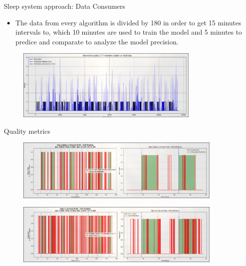 \documentclass[10pt]{beamer} %
\begin{document}
\begin{frame}{Sleep system approach: Data Consumers } %
 \begin{itemize}
    \item \footnotesize The data from every algorithm is divided by 180 in order to get 15 minutes intervals to, which 10 minutes are used to train the model and 5 minutes
    to predice and comparate to analyze the model precision. 
\end{itemize}
          \begin{figure}
            
             \includegraphics[width=0.8\textwidth]{figures/sadehvsReal.png} %
             \end{figure}
\end{frame}

\begin{frame}{Quality metrics}
        \begin{figure}
      
        \includegraphics[width=0.9\textwidth]{figures/colevsGReal.png} %
        \end{figure}
        \begin{figure}
        \centering
        \includegraphics[width=0.9\textwidth]{figures/opalvsGReal.png} %
        \end{figure}
\end{frame}
\end{document}
